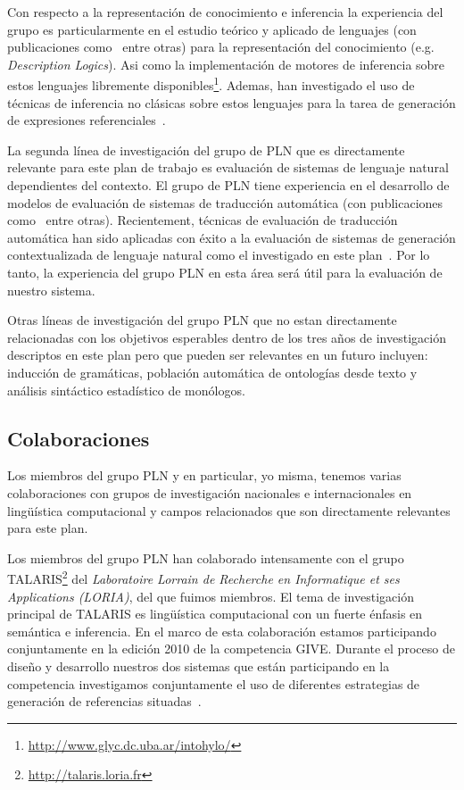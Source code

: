 \documentclass[11pt]{article}
\begin{document}
Con respecto a la representaci\'on de conocimiento e inferencia la experiencia
del grupo es particularmente en el estudio te\'orico y aplicado de lenguajes
(con publicaciones como~\citep{arec:logi00,arec:reso01,arec:reso10} entre otras)
para la representaci\'on del conocimiento (e.g. \emph{Description Logics}). Asi
como la implementaci\'on de motores de inferencia sobre estos lenguajes
libremente disponibles\footnote{\url{http://www.glyc.dc.uba.ar/intohylo/}}.
Ademas, han investigado el uso de t\'ecnicas de inferencia no cl\'asicas sobre
estos lenguajes para la tarea de generaci\'on de expresiones
referenciales~\citep{AKS08}.

La segunda l\'inea de investigaci\'on del grupo de PLN que es directamente
relevante para este plan de trabajo es evaluaci\'on de sistemas de lenguaje
natural dependientes del contexto. El grupo de PLN tiene experiencia en el
desarrollo de modelos de evaluaci\'on de sistemas de traducci\'on
autom\'atica (con publicaciones como~\citep{estrella08,estrella10} entre
otras). Recientement, t\'ecnicas de evaluaci\'on de traducci\'on autom\'atica
han sido aplicadas con \'exito a la evaluaci\'on de sistemas de generaci\'on
contextualizada de lenguaje natural como el investigado en este
plan~\citep{reiter09}. Por lo tanto, la experiencia del grupo PLN en esta
\'area ser\'a \'util para la evaluaci\'on de nuestro sistema. 

Otras l\'ineas de investigaci\'on del grupo PLN que no estan directamente
relacionadas con los objetivos esperables dentro de los tres a\~nos de
investigaci\'on descriptos en este plan pero que pueden ser relevantes en un
futuro incluyen: inducci\'on de gram\'aticas, poblaci\'on autom\'atica de
ontolog\'ias desde texto y an\'alisis sint\'actico estad\'istico de
mon\'ologos.  
          


\subsection{Colaboraciones} \label{colaboraciones}

Los miembros del grupo PLN y en particular, yo misma, tenemos varias
colaboraciones con grupos de investigaci\'on nacionales e internacionales en
ling\"u\'istica computacional y campos relacionados que son directamente
relevantes para este plan. 

Los miembros del grupo PLN han colaborado intensamente con el grupo
TALARIS\footnote{\url{http://talaris.loria.fr}}
del \emph{Laboratoire Lorrain de Recherche en Informatique et ses
Applications (LORIA)}, del que fuimos miembros. El tema de investigaci\'on
principal de TALARIS es ling\"u\'istica computacional con un fuerte \'enfasis
en sem\'antica e inferencia. En el marco de esta colaboraci\'on estamos
participando conjuntamente en la edici\'on 2010 de la competencia GIVE. Durante
el proceso de dise\~no y desarrollo nuestros dos sistemas que est\'an
participando en la competencia investigamos conjuntamente el uso de diferentes
estrategias de generaci\'on de referencias situadas~\citep{amoia10}. 
\end{document}
